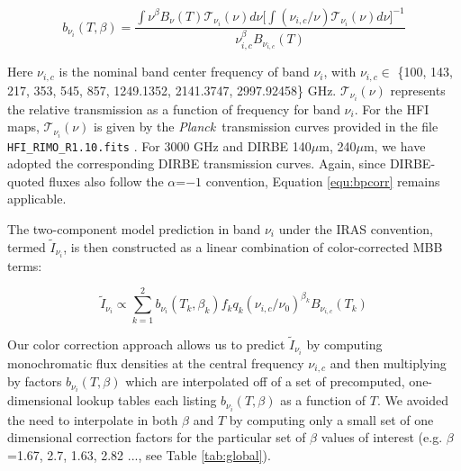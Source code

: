 \documentclass{emulateapj}
\newcommand{\PLANCK}{{\it Planck}}
\begin{document}
\begin{equation} \label{equ:bpcorr}
b_{\nu_i}(T, \beta) = \frac{\int \nu^{\beta}B_{\nu}(T)\mathcal{T}_{\nu_i}(\nu) d\nu \bigg[\int (\nu_{i,c}/\nu)\mathcal{T}_{\nu_i}(\nu) d\nu\bigg]^{-1}}{\nu_{i,c}^{\beta}B_{\nu_{i,c}}(T)}
\end{equation}


Here $\nu_{i,c}$ is the nominal band center frequency of band $\nu_i$,  with 
$\nu_{i,c} \in$ \{100, 143, 217, 353, 545, 857, 1249.1352, 2141.3747, 
2997.92458\} GHz. $\mathcal{T}_{\nu_i}(\nu)$ represents the relative 
transmission as a function of frequency for band $\nu_i$. For the HFI maps, 
$\mathcal{T}_{\nu_i}(\nu)$ is given by the \PLANCK~transmission curves provided
in the file \verb|HFI_RIMO_R1.10.fits| \citep{planckresponse}. For 3000 GHz and
DIRBE 140$\mu$m, 240$\mu$m, we have adopted the corresponding DIRBE 
transmission curves. Again, since DIRBE-quoted fluxes also follow the 
$\alpha$=$-1$ convention, Equation \ref{equ:bpcorr} remains applicable.



The two-component model prediction in band $\nu_i$ under the IRAS convention, 
termed $\tilde{I}_{\nu_i}$, is then constructed as a linear combination of 
color-corrected MBB terms:

\begin{equation} \label{equ:iras}
\tilde{I}_{\nu_i} \propto \sum_{k=1}^{2} b_{\nu_i}(T_k, \beta_k) f_k q_k (\nu_{i,c}/\nu_0)^{\beta_k} B_{\nu_{i,c}}(T_k)
\end{equation}

Our color correction approach allows us to predict $\tilde{I}_{\nu_i}$ by 
computing monochromatic flux densities at the central frequency $\nu_{i,c}$ and
then multiplying by factors $b_{\nu_i}(T, \beta)$ which are interpolated off of
a set of precomputed, one-dimensional lookup tables each listing 
$b_{\nu_i}(T, \beta)$ as a function of $T$. We avoided the need to interpolate 
in both $\beta$ and $T$ by computing only a small set of one dimensional 
correction factors for the particular set of $\beta$ values of interest (e.g. 
$\beta$=1.67, 2.7, 1.63, 2.82 ..., see Table \ref{tab:global}).
\end{document}
